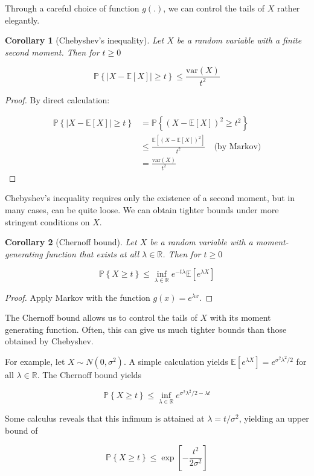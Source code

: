 \documentclass{article}
\newcommand{\R}{\mathbb{R}}
\newcommand{\ev}[1]{\mathbb{E}\left[#1\right]}
\newcommand{\prob}[1]{\mathbb{P}\left\{#1\right\}}
\newcommand{\var}{\textrm{var}}
\newtheorem{corollary}{Corollary}
\begin{document}
Through a careful choice of function $g(.)$, we can control the tails of $X$
rather elegantly.

\begin{corollary}[Chebyshev's inequality]
	Let $X$ be a random variable with a finite second moment. Then for $t
	\geq 0$

	$$\prob{|X - \ev{X}| \geq t} \leq \frac{\var(X)}{t^2}$$
\end{corollary}

\begin{proof}
	By direct calculation:

	\begin{align*}
		\prob{|X - \ev{X}| \geq t} &= \prob{(X - \ev{X})^2 \geq t^2} \\ 
		&\leq \frac{\ev{(X  - \ev{X})^2}}{t^2} \quad \textrm{(by Markov)} \\
		&= \frac{\var(X)}{t^2}
	\end{align*}
\end{proof}

Chebyshev's inequality requires only the existence of a second moment, but in
many cases, can be quite loose. We can obtain tighter bounds under more
stringent conditions on $X$. 

\begin{corollary}[Chernoff bound]
	Let $X$ be a random variable with a moment-generating function that
	exists at all $\lambda \in \R$.  Then for $t \geq 0$

	$$\prob{X \geq t} \leq \inf_{\lambda \in \R}e^{-t\lambda}\ev{e^{\lambda X}}$$
\end{corollary}

\begin{proof}
	Apply Markov with the function $g(x) = e^{\lambda x}$.
\end{proof}

The Chernoff bound allows us to control the tails of $X$ with its moment
generating function. Often, this can give us much tighter bounds than those
obtained by Chebyshev. 

For example, let $X \sim N(0, \sigma^2)$. A simple calculation yields
$\ev{e^{\lambda X}} = e^{\sigma^2 \lambda^2 / 2}$ for all $\lambda \in \R$. The
Chernoff bound yields 

$$\prob{X \geq t} \leq \inf_{\lambda \in \R}e^{\sigma^2\lambda^2/2 - \lambda
t}$$

Some calculus reveals that this infimum is attained at $\lambda = t / \sigma^2$,
yielding an upper bound of 

$$\prob{X \geq t} \leq \exp\left[-\frac{t^2}{2\sigma^2}\right]$$
\end{document}
